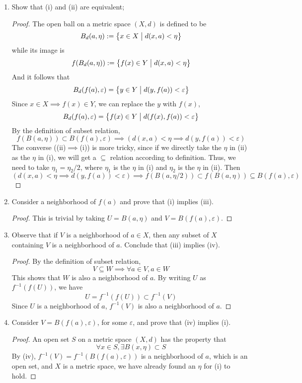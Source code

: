 \begin{enumerate}
	\item Show that (i) and (ii) are equivalent;
    \begin{proof}
    The open ball on a metric space \((X,d)\) is defined to be
    \[ B_d(a,\eta):=\Set{x\in X}{d(x,a)<\eta} \]
    while its image is
    \[ f(B_d(a,\eta)):=\Set{f(x)\in Y}{d(x,a)<\eta} \]
    And it follows that
    \[ B_d(f(a),\varepsilon)=\Set{y\in Y}{d(y,f(a))<\varepsilon} \]
    Since \(x\in X\implies f(x)\in Y\), we can replace the $y$ with \(f(x)\),
    \[ B_d(f(a),\varepsilon)=\Set{f(x)\in Y}{d(f(x),f(a))<\varepsilon} \]
    By the definition of subset relation,
    \[ f(B(a,\eta))\subset B(f(a),\varepsilon) \implies \left(d(x,a)<\eta\implies d(y,f(a))<\varepsilon\right) \]
    The converse ((ii)$\implies$(i)) is more tricky, since if we directly take the $\eta$ in (ii) as the $\eta$ in (i), we will get a $\subseteq$ relation according to definition.
    Thus, we need to take \(\eta_1=\eta_2/2\), where $\eta_1$ is the $\eta$ in (i) and $\eta_2$ is the $\eta$ in (ii).
    Then
    \[ \left(d(x,a)<\eta\implies d(y,f(a))<\varepsilon\right) \implies f(B(a,\eta/2))\subset f(B(a,\eta)) \subseteq B(f(a),\varepsilon) \]
    \end{proof}
    \item Consider a neighborhood of \(f(a)\) and prove that (i) implies (iii).
    \begin{proof}
    This is trivial by taking \(U=B(a,\eta)\) and \(V=B(f(a),\varepsilon)\).
    \end{proof}
    \item Observe that if $V$ is a neighborhood of \(a \in X\), then any subset of $X$ containing $V$ is a neighborhood of $a$.
    Conclude that (iii) implies (iv).
    \begin{proof}
    By the definition of subset relation,
    \[ V\subseteq W\implies \forall a\in V,a\in W \]
    This shows that $W$ is also a neighborhood of $a$.
    By writing $U$ as \(f^{-1}(f(U))\), we have
    \[ U=f^{-1}(f(U))\subset f^{-1}(V) \]
    Since $U$ is a neighborhood of $a$, \(f^{-1}(V)\) is also a neighborhood of $a$.
    \end{proof}
    \item Consider \(V = B(f(a), \varepsilon)\), for some $\varepsilon$, and prove that (iv) implies (i).
    \begin{proof}
    An open set $S$ on a metric space \((X,d)\) has the property that 
    \[ \forall x\in S, \exists B(x,\eta)\subset S \]
    By (iv), \(f^{-1}(V)=f^{-1}(B(f(a), \varepsilon))\) is a neighborhood of $a$, which is an open set, and $X$ is a metric space, we have already found an $\eta$ for (i) to hold.
    \end{proof}
\end{enumerate}